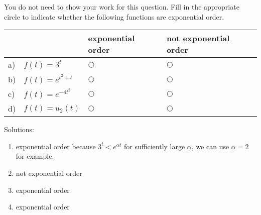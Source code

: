 \ifnum {}
\question[1] You do not need to show your work for this question. Fill in the appropriate circle to indicate whether the following functions are exponential order. 
\vspace{-0.4cm}
\setlength{\extrarowheight}{0.20cm}
\begin{center}
\hspace{-.9cm}\begin{tabular}{ p{0.20cm} p{4cm} p{3.5cm} p{4cm} }
    & & exponential order &  not exponential order  \\[2pt] \hline 
    a) & $f(t) = 3^t$ & $\bigcirc$  & $\bigcirc$ \\[8pt]  
    b) & $f(t) = e^{t^2+t}$  & $\bigcirc$  & $\bigcirc$ \\[8pt] 
    c) & $f(t) = e^{-4t^2}$  & $\bigcirc$  & $\bigcirc$ \\[8pt] 
    d) & $f(t) = u_2(t)$  & $\bigcirc$  & $\bigcirc$ \\[8pt] 
    \hline
\end{tabular}
\end{center}
\setlength{\extrarowheight}{0.0cm}
\ifnum {} {\color{DarkBlue} Solutions: 
\begin{enumerate}[label=(\alph*)]
    \item exponential order because $3^t < e^{\alpha t}$ for sufficiently large $\alpha $, we can use $\alpha = 2$ for example. 
    \item not exponential order
    \item exponential order
    \item exponential order
\end{enumerate}
}
\fi
\vspace{-6pt} 
\fi 



